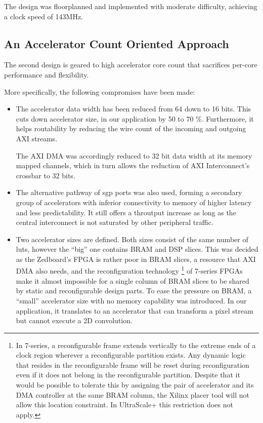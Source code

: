 The design was floorplanned and implemented with moderate difficulty, 
achieving a clock speed of 143MHz.

\subsection{An Accelerator Count Oriented Approach}

The second design is geared to high accelerator core count 
that sacrifices per-core performance and flexibility.

More specifically, the following compromises have been made:

\begin{itemize}
\item	The accelerator data width has been reduced from 64 down to 16 bits.
	This cuts down accelerator size, in our application by 50 to 70 \%.
	Furthermore, it helps routability by reducing the wire count of the
	incoming and outgoing AXI streams. 
	
	The AXI DMA was accordingly reduced to 32 bit data width at its memory mapped channels,
	which in turn allows the reduction of AXI Interconnect's crossbar to 32 bits.

\item	The alternative pathway of \gls{sgp} ports was also used, forming a secondary
	group of accelerators with inferior connectivity to memory of higher latency
	and less predictability. 
	It still offers a throutput increase as long as the central interconnect is not
	saturated by other peripheral traffic.

\item	Two accelerator sizes are defined. 
	Both sizes consist of the same number of \glspl{lut},
	however the ``big'' one contains BRAM and DSP slices. This was decided as the
	Zedboard's FPGA is rather poor in BRAM slices, a resource that AXI DMA also needs,
	and the reconfiguration technology
	\footnote{In 7-series, a reconfigurable frame extends vertically to the extreme ends of a 
	clock region wherever a reconfigurable partition exists. Any dynamic logic that resides
	in the reconfigurable frame will be reset during reconfiguration even if it does not
	belong in the reconfigurable partition. Despite that it would be possible to tolerate
	this by assigning the pair of accelerator and its DMA controller at the same BRAM column,
	the Xilinx placer tool will not allow this location constraint. In UltraScale+ this
	restriction does not apply.}
	of 7-series FPGAs make it almost impossible
	for a single column of BRAM slices to be shared by static and reconfigurable design parts.
	To ease the pressure on BRAM, a ``small'' accelerator size with no memory capability was
	introduced. In our application, it translates to an accelerator that can transform
	a pixel stream but cannot execute a 2D convolution.


\end{itemize}
